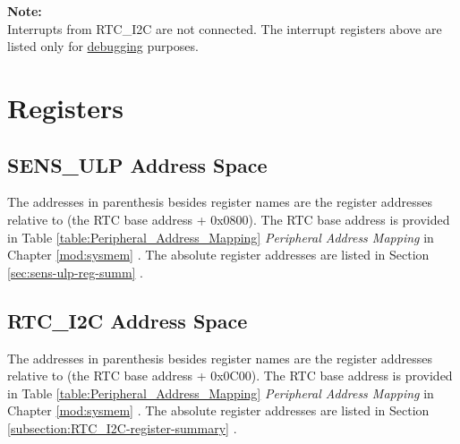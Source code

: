 \documentclass[main\_\_EN.tex]{subfiles}
\begin{document}
\textbf{Note:} \\
Interrupts from RTC\_I2C are not connected. The interrupt registers above are listed only for \hyperref[paragraph:ULP-detecting-errors]{debugging} purposes.

\newpage
\section{Registers}

\subsection{SENS\_ULP Address Space}
The addresses in parenthesis besides register names are the register addresses relative to (the RTC base address + 0x0800). The RTC base address is provided in Table \ref{table:Peripheral_Address_Mapping} \textit{Peripheral Address Mapping} in Chapter \ref{mod:sysmem} \textit{}. The absolute register addresses are listed in Section \ref{sec:sens-ulp-reg-summ} \textit{}.


\subsection{RTC\_I2C Address Space}
The addresses in parenthesis besides register names are the register addresses relative to (the RTC base address + 0x0C00). The RTC base address is provided in Table \ref{table:Peripheral_Address_Mapping} \textit{Peripheral Address Mapping} in Chapter \ref{mod:sysmem} \textit{}. The absolute register addresses are listed in Section \ref{subsection:RTC_I2C-register-summary} \textit{}.

\end{document}
